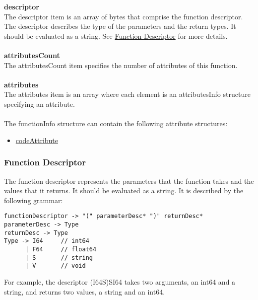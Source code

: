 \documentclass[12pt]{article}
\newcommand*{\formalfont}{\fontfamily{ptm}\selectfont}
\newcommand\tab[1][1cm]{\hspace*{#1}}
\begin{document}
			\textbf{descriptor} \\
				\tab The {\formalfont descriptor} item is an array of bytes that comprise the function descriptor. The descriptor describes the type of the parameters and the return types. It should be evaluated as a string. See \hyperref[sec:functionDescriptor]{Function Descriptor} for more details.  \\ \\
			\textbf{attributesCount} \\
				\tab The {\formalfont attributesCount} item specifies the number of attributes of this function. \\ \\
			\textbf{attributes} \\
				\tab The {\formalfont attributes} item is an array where each element is an {\formalfont attributesInfo} structure specifying an attribute. \\ \\
				The {\formalfont functionInfo} structure can contain the following attribute structures:
				\begin{itemize}
					\item {\formalfont \hyperref[sec:codeAttribute]{codeAttribute}}
				\end{itemize}
				
			\subsubsection{Function Descriptor}
			\label{sec:functionDescriptor}
				The function descriptor represents the parameters that the function takes and the values that it returns. It should be evaluated as a string. It is described by the following grammar:
				\begin{Verbatim}[frame=single]
functionDescriptor -> "(" parameterDesc* ")" returnDesc* 
parameterDesc -> Type
returnDesc -> Type
Type -> I64     // int64
      | F64     // float64
      | S       // string
      | V       // void
				\end{Verbatim}
				For example, the descriptor \colorbox{code}{(I64S)SI64} takes two arguments, an int64 and a string, and returns two values, a string and an int64.
				
				
\end{document}
